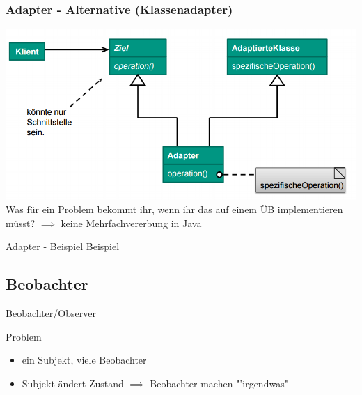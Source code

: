 \documentclass[18pt]{beamer}
\begin{document}
	\begin{frame}
		\frametitle{Adapter - Alternative (Klassenadapter)}
		\includegraphics[scale=0.45]{./pics/tut3/adap-cl.png} \linebreak \pause
		Was für ein Problem bekommt ihr, wenn ihr das auf einem ÜB implementieren müsst? \pause \linebreak
		$\implies$ keine Mehrfachvererbung in Java
	\end{frame}

	\begin{frame}{Adapter - Beispiel}
		\centering \huge Beispiel
	\end{frame}

	\subsection{Beobachter}
	\begin{frame}{Beobachter/Observer}
		\begin{block}{Problem}
			\begin{itemize}
				\item ein Subjekt, viele Beobachter
				\item Subjekt ändert Zustand $\implies$ Beobachter machen "'irgendwas"
			\end{itemize}		
		\end{block}
	\end{frame}
\end{document}
